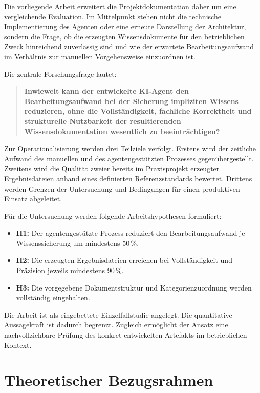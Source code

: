 \documentclass[
  10pt,
  ngerman,
  a4paper,
  toc=graduated,
  numbers=noenddot,
  headings=standardclasses,
  nonumberlist
]{scrartcl}
\newcommand{\pct}[1]{#1\,\%}
\begin{document}
Die vorliegende Arbeit erweitert die Projektdokumentation daher um eine vergleichende Evaluation. 
Im Mittelpunkt stehen nicht die technische Implementierung des Agenten oder eine erneute Darstellung der Architektur,
sondern die Frage, ob die erzeugten Wissensdokumente für den betrieblichen Zweck hinreichend zuverlässig sind und 
wie der erwartete Bearbeitungsaufwand im Verhältnis zur manuellen Vorgehensweise einzuordnen ist.

Die zentrale Forschungsfrage lautet:

\begin{quote}
\textbf{Inwieweit kann der entwickelte KI-Agent den Bearbeitungsaufwand bei der Sicherung impliziten Wissens reduzieren, ohne die Vollständigkeit, fachliche Korrektheit und strukturelle Nutzbarkeit der resultierenden Wissensdokumentation wesentlich zu beeinträchtigen?}
\end{quote}

Zur Operationalisierung werden drei Teilziele verfolgt. Erstens wird der zeitliche Aufwand des manuellen und des agentengestützten Prozesses gegenübergestellt. Zweitens wird die Qualität zweier bereits im Praxisprojekt erzeugter Ergebnisdateien anhand eines definierten Referenzstandards bewertet. Drittens werden Grenzen der Untersuchung und Bedingungen für einen produktiven Einsatz abgeleitet.

Für die Untersuchung werden folgende Arbeitshypothesen formuliert:

\begin{itemize}
\item \textbf{H1:} Der agentengestützte Prozess reduziert den Bearbeitungsaufwand je Wissenssicherung um mindestens \pct{50}.
\item \textbf{H2:} Die erzeugten Ergebnisdateien erreichen bei Vollständigkeit und Präzision jeweils mindestens \pct{90}.
\item \textbf{H3:} Die vorgegebene Dokumentstruktur und Kategorienzuordnung werden vollständig eingehalten.
\end{itemize}

Die Arbeit ist als eingebettete Einzelfallstudie angelegt. Die quantitative Aussagekraft ist dadurch begrenzt.
Zugleich ermöglicht der Ansatz eine nachvollziehbare Prüfung des konkret entwickelten Artefakts im betrieblichen Kontext.

\section{Theoretischer Bezugsrahmen}
\end{document}
